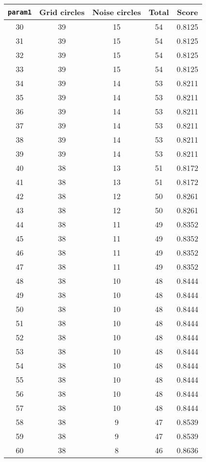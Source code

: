 \documentclass[letterpaper, 12pt]{article}
\begin{document}
\begin{longtable}{|c|c|c|c|c|}
\hline
\textbf{\texttt{param1}} & \textbf{Grid circles} & \textbf{Noise circles} & \textbf{Total} & \textbf{Score} \\
\hline
30 & 39 & 15 & 54 & 0.8125 \\
\hline
31 & 39 & 15 & 54 & 0.8125 \\
\hline
32 & 39 & 15 & 54 & 0.8125 \\
\hline
33 & 39 & 15 & 54 & 0.8125 \\
\hline
34 & 39 & 14 & 53 & 0.8211 \\
\hline
35 & 39 & 14 & 53 & 0.8211 \\
\hline
36 & 39 & 14 & 53 & 0.8211 \\
\hline
37 & 39 & 14 & 53 & 0.8211 \\
\hline
38 & 39 & 14 & 53 & 0.8211 \\
\hline
39 & 39 & 14 & 53 & 0.8211 \\
\hline
40 & 38 & 13 & 51 & 0.8172 \\
\hline
41 & 38 & 13 & 51 & 0.8172 \\
\hline
42 & 38 & 12 & 50 & 0.8261 \\
\hline
43 & 38 & 12 & 50 & 0.8261 \\
\hline
44 & 38 & 11 & 49 & 0.8352 \\
\hline
45 & 38 & 11 & 49 & 0.8352 \\
\hline
46 & 38 & 11 & 49 & 0.8352 \\
\hline
47 & 38 & 11 & 49 & 0.8352 \\
\hline
48 & 38 & 10 & 48 & 0.8444 \\
\hline
49 & 38 & 10 & 48 & 0.8444 \\
\hline
50 & 38 & 10 & 48 & 0.8444 \\
\hline
51 & 38 & 10 & 48 & 0.8444 \\
\hline
52 & 38 & 10 & 48 & 0.8444 \\
\hline
53 & 38 & 10 & 48 & 0.8444 \\
\hline
54 & 38 & 10 & 48 & 0.8444 \\
\hline
55 & 38 & 10 & 48 & 0.8444 \\
\hline
56 & 38 & 10 & 48 & 0.8444 \\
\hline
57 & 38 & 10 & 48 & 0.8444 \\
\hline
58 & 38 & 9 & 47 & 0.8539 \\
\hline
59 & 38 & 9 & 47 & 0.8539 \\
\hline
60 & 38 & 8 & 46 & 0.8636 \\

\end{longtable}
\end{document}
